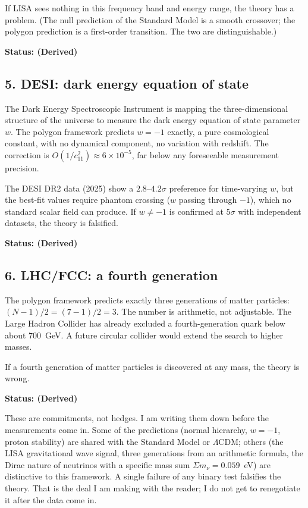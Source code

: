 If LISA sees nothing in this frequency band and energy range, the theory
has a problem. (The null prediction of the Standard Model is a smooth
crossover; the polygon prediction is a first-order transition. The two
are distinguishable.)

\textbf{Status: (Derived)}

\subsection*{5. DESI: dark energy equation of state}

The Dark Energy Spectroscopic Instrument is mapping the three-dimensional
structure of the universe to measure the dark energy equation of state
parameter $w$. The polygon framework predicts $w = -1$ exactly, a pure
cosmological constant, with no dynamical component, no variation with
redshift. The correction is $O(1/c_{11}^2) \approx 6 \times 10^{-5}$,
far below any foreseeable measurement precision.

The DESI DR2 data (2025) show a $2.8$--$4.2\sigma$ preference for
time-varying $w$, but the best-fit values require phantom crossing
($w$ passing through $-1$), which no standard scalar field can produce.
If $w \ne -1$ is confirmed at $5\sigma$ with independent datasets,
the theory is falsified.

\textbf{Status: (Derived)}

\subsection*{6. LHC/FCC: a fourth generation}

The polygon framework predicts exactly three generations of matter
particles: $(N - 1)/2 = (7 - 1)/2 = 3$. The number is arithmetic, not
adjustable. The Large Hadron Collider has already excluded a
fourth-generation quark below about $700$~GeV. A future circular
collider would extend the search to higher masses.

If a fourth generation of matter particles is discovered at any mass,
the theory is wrong.

\textbf{Status: (Derived)}

\bigskip

\noindent
These are commitments, not hedges. I am writing them down before the
measurements come in. Some of the predictions (normal hierarchy,
$w = -1$, proton stability) are shared with the Standard Model or
$\Lambda$CDM; others (the LISA gravitational wave signal, three
generations from an arithmetic formula, the Dirac nature of neutrinos
with a specific mass sum $\Sigma m_\nu = 0.059$~eV) are distinctive
to this framework. A single failure of any binary test falsifies the
theory. That is the deal I am making with the reader; I do not get to
renegotiate it after the data come in.


